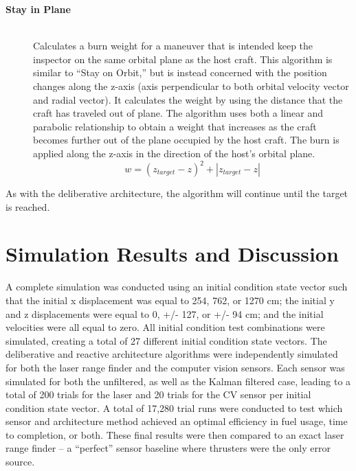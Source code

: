 \documentclass[journal, 10pt]{IEEEtran}
\begin{document}
\begin{description}
\item[\textbf{Stay in Plane}] \hfill \\
Calculates a burn weight for a maneuver that is intended keep the inspector on the same orbital plane as the host craft.  This algorithm is similar to ``Stay on Orbit,'' but is instead concerned with the position changes along the z-axis (axis perpendicular to both orbital velocity vector and radial vector).  It calculates the weight by using the distance that the craft has traveled out of plane.  The algorithm uses both a linear and parabolic relationship to obtain a weight that increases as the craft becomes further out of the plane occupied by the host craft.  The burn is applied along the z-axis in the direction of the host's orbital plane.
\begin{equation}
w = (z_{target}-z)^2+|z_{target}-z|
\end{equation}
\end{description}

As with the deliberative architecture, the algorithm will continue until the target is reached.

\section{Simulation Results and Discussion} \label{discuss}
A complete simulation was conducted using an initial condition state vector such that the initial x displacement was equal to 254, 762, or 1270 cm; the initial y and z displacements were equal to 0, +/- 127, or +/- 94 cm; and the initial velocities were all equal to zero. All initial condition test combinations were simulated, creating a total of 27 different initial condition state vectors. The deliberative and reactive architecture algorithms were independently simulated for both the laser range finder and the computer vision sensors. Each sensor was simulated for both the unfiltered, as well as the Kalman filtered case, leading to a total of 200 trials for the laser and 20 trials for the CV sensor per initial condition state vector. A total of 17,280 trial runs were conducted to test which sensor and architecture method achieved an optimal efficiency in fuel usage, time to completion, or both. These final results were then compared to an exact laser range finder -- a ``perfect'' sensor baseline where thrusters were the only error source. 
\end{document}
